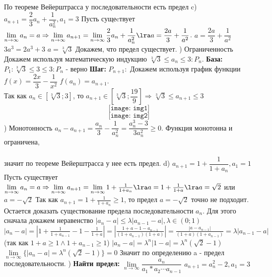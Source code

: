 \documentclass[11pt]{article}
\begin{document}
	По теореме Вейерштрасса у последовательности есть предел \bs
	\bs
	c) $a_{n + 1} = \dfrac{2}{3}a_n  + \dfrac{1}{a_n^2}, a_1 = 3$ \bs
	Пусть сущеcтвует $\lim\limits_{n\to \infty} a_n = a \Rightarrow \lim\limits_{n\to \infty} a_{n + 1} = \lim\limits_{n\to \infty}  \dfrac{2}{3}a_n  + \dfrac{1}{a_n^2} \lra a = \dfrac{2a}{3} + \dfrac{1}{a^2}$. \bs
	$ a = \dfrac{2a}{3} + \dfrac{1}{a^2}$ \sspace
	$3a^3 = 2a^3 + 3$ \sspace
	$a = \sqrt[3]{3}$ \bs
	Докажем, что предел существует. ) Ограниченность \sspace
	Докажем используя математическую индукцию $\sqrt[3]{3} \leq a_n \leq 3: P_n$. \sspace
	\textbf{База:} $P_1: \sqrt[3]{3} \leq 3 \leq 3: P_n$ - верно \sspace
	\textbf{Шаг:} $P_{n + 1}: $ Докажем используя график функции $f(x) = \dfrac{2x}{3} - \dfrac{1}{x^2}$
	\newpage \quad \sspace
	$f(a_n) = a_{n + 1}$. \\
	Так как $a_n \in [\sqrt[3]{3}; 3]$, то $a_{n + 1} \in [\sqrt[3]{3}; \dfrac{19}{9}] \Rightarrow \sqrt[3]{3} \leq a_{n + 1} \leq 3$
	\[\texttt{[image: img1]}\]
	\bs
	\[\texttt{[image: img2]}\]
	\newpage \quad {}) Монотонность \bs
	$a_{n} - a_{n + 1} = \dfrac{a_n}{3} - \dfrac{1}{a_n^2} = \dfrac{a_n^3 - 3}{3a_n^2} \geq 0$. Функция монотонна и ограничена,\\
	\\
	 значит по теореме Вейерштрасса у нее есть предел. \bs
	\bs
	d) $a_{n + 1} = 1 + \dfrac{1}{1 + a_n}, a_1 = 1$ \bs
	Пусть существует   $\lim\limits_{n\to \infty} a_n = a \Rightarrow \lim\limits_{n\to \infty} a_{n + 1} = \lim\limits_{n\to \infty} 1 + \frac{1}{1 + a_n} \lra a = 1 + \frac{1}{1 + a} \lra a = \sqrt{2}$ или $a = -\sqrt{2}$ \sspace
	Так как $a_{n + 1} = 1 + \frac{1}{1 + a_n} \geq 1$, то предел $a = -\sqrt{2}$ точно не подходит. Остается доказать существование предела последовательности $a_n$. \bs
	Для этого сначала докажем неравенство $|a_n - a| \leq \lambda|a_{n - 1} - a|, \lambda \in (0; 1) $ \bs
	$|a_n - a| = | 1 + \frac{1}{1 + a_{n - 1}} - 1 - \frac{1}{1 + a}| = | \frac{1 + a - 1 - a_{n - 1}}{(1 + a_{n - 1})(1 + a)}| = \frac{| a - a_{n - 1}|}{(1 + a)(1 + a_{n - 1})} = \lambda|a_{n-1} - a| $  \sspace
	(так как $1 + a \geq 1 \land 1 + a_{n - 1} \geq 1$)
	\bs
	$|a_n - a| = \lambda^n|1 - a| = \lambda^n(\sqrt{2} - 1)$ \bs
	$\lim\limits_{n\to \infty} \bigg\{|a_n - a| = \lambda^n(\sqrt{2} - 1) \bigg\} = 0$ \bs
	Значит по определению a - предел последовательности. 
	\bs
	) \textbf{Найти предел:} $\lim\limits_{n\to \infty} \dfrac{a_n}{a_1*a_2\cdots a_{n - 1}}$ \bs
	$a_{n + 1} = a_n^2 - 2, a_1 = 3$ \bs
\end{document}
